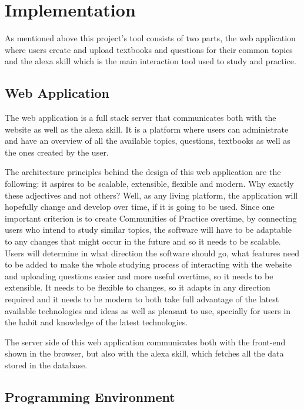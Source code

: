 \chapter{Implementation}
\label{cha:implementation}

As mentioned above this project's tool consists of two parts, 
the web application where users create and upload textbooks and questions for their common 
topics and the alexa skill which is the main interaction tool used to study and practice.

\section{Web Application}

The web application is a full stack server that communicates both with the website as well 
as the alexa skill. It is a platform where users can administrate and have an overview of 
all the available topics, questions, textbooks as well as the ones created by the user.

The architecture principles behind the design of this web application are the following:
it aspires to be scalable, extensible, flexible and modern. Why exactly these adjectives
and not others? Well, as any living platform, the application will hopefully change and
develop over time, if it is going to be used. Since one important criterion is to 
create Communities of Practice overtime, by connecting users who intend to study
similar topics, the software will have to be adaptable to any changes that might occur 
in the future and so it needs to be scalable. Users will determine in what direction 
the software should go, what features need to be added to make the whole studying 
process of interacting with the website and uploading questions easier and more useful
overtime, so it needs to be extensible. It needs to be flexible to changes, so it 
adapts in any direction required and it needs to be modern to both take full advantage
of the latest available technologies and ideas as well as pleasant to use, specially
for users in the habit and knowledge of the latest technologies.

The server side of this web application communicates both with the front-end shown
in the browser, but also with the alexa skill, which fetches all the data stored 
in the database.


\section{Programming Environment}


